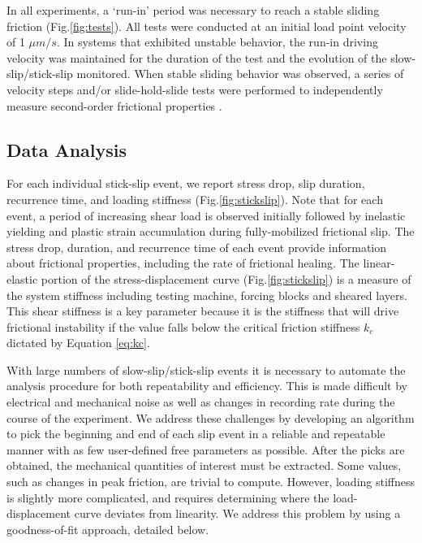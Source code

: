 In all experiments, a `run-in' period was necessary to reach a stable sliding
friction (Fig.\ref{fig:tests}).  All tests were conducted at an initial load
point velocity of 1 $\mu m/s$.  In systems that exhibited unstable behavior, the
run-in driving velocity was maintained for the duration of the test and the
evolution of the slow-slip/stick-slip monitored.  When stable sliding behavior
was observed, a series of velocity steps and/or slide-hold-slide tests were
performed to independently measure second-order frictional properties
\cite{Marone_1998}.

\subsection{Data Analysis}

For each individual stick-slip event, we report stress drop, slip duration,
recurrence time, and loading stiffness (Fig.\ref{fig:stickslip}). Note that for
each event, a period of increasing shear load is observed initially followed by
inelastic yielding and plastic strain accumulation during fully-mobilized
frictional slip. The stress drop, duration, and recurrence time of each event
provide information about frictional properties, including the rate of
frictional healing. The linear-elastic portion of the stress-displacement curve
(Fig.\ref{fig:stickslip}) is a measure of the system stiffness including testing
machine, forcing blocks and sheared layers. This shear stiffness is a key
parameter because it is the stiffness that will drive frictional instability if
the value falls below the critical friction stiffness $k_c$ dictated by Equation
\ref{eq:kc}.

With large numbers of slow-slip/stick-slip events it is necessary to automate
the analysis procedure for both repeatability and efficiency.  This is made
difficult by electrical and mechanical noise as well as changes in recording
rate during the course of the experiment.  We address these challenges by
developing an algorithm to pick the beginning and end of each slip event in a
reliable and repeatable manner with as few user-defined free parameters as
possible.  After the picks are obtained, the mechanical quantities of interest
must be extracted.  Some values, such as changes in peak friction, are trivial
to compute.  However, loading stiffness is slightly more complicated, and
requires determining where the load-displacement curve deviates from linearity.
We address this problem by using a goodness-of-fit approach, detailed below.

